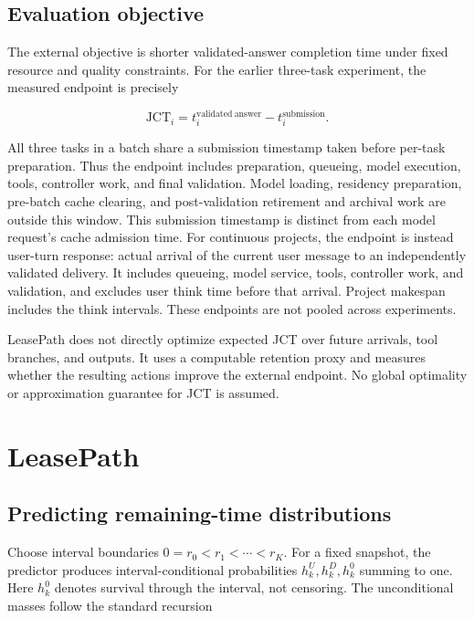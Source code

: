 \documentclass[sigconf, screen, review]{acmart}
\begin{document}
\subsection{Evaluation objective}\label{evaluation-objective}

The external objective is shorter validated-answer completion time under
fixed resource and quality constraints. For the earlier three-task experiment,
the measured endpoint is precisely

\[
\mathrm{JCT}_i=t_i^{\mathrm{validated\ answer}}-t_i^{\mathrm{submission}}.
\]

All three tasks in a batch share a submission timestamp taken before
per-task preparation. Thus the endpoint includes preparation, queueing,
model execution, tools, controller work, and final validation. Model
loading, residency preparation, pre-batch cache clearing, and
post-validation retirement and archival work are outside this window.
This submission timestamp is distinct from each model request's cache
admission time. For continuous projects, the endpoint is instead
user-turn response: actual arrival of the current user message to an
independently validated delivery. It includes queueing, model service,
tools, controller work, and validation, and excludes user think time
before that arrival. Project makespan includes the think intervals.
These endpoints are not pooled across experiments.

LeasePath does not directly optimize expected JCT over future arrivals,
tool branches, and outputs. It uses a computable retention proxy and
measures whether the resulting actions improve the external endpoint. No
global optimality or approximation guarantee for JCT is assumed.

\section{LeasePath}\label{leasepath}

\subsection{Predicting remaining-time
distributions}\label{predicting-remaining-time-distributions}

Choose interval boundaries \(0=r_0<r_1<\cdots<r_K\). For a fixed
snapshot, the predictor produces interval-conditional probabilities
\(h_k^U,h_k^D,h_k^0\) summing to one. Here \(h_k^0\) denotes survival
through the interval, not censoring. The unconditional masses follow the
standard recursion
\end{document}
